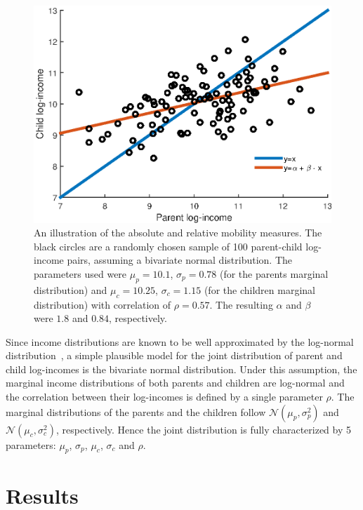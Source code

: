 \documentclass[12pt,times,letter]{article}
\newcommand{\flabel}[1]{\label{fig:#1}}
\numberwithin{equation}{section}
\begin{document}
\begin{figure}[!htb]
\centering
\includegraphics[width=1.0\textwidth]{./figs/bivariate_lines3.eps}
\caption{An illustration of the absolute and relative mobility measures. The black circles are a randomly chosen sample of 100 parent-child log-income pairs, assuming a bivariate normal distribution. The parameters used were $\mu_p=10.1$, $\sigma_p=0.78$ (for the parents marginal distribution) and $\mu_c=10.25$, $\sigma_c=1.15$ (for the children marginal distribution) with correlation of $\rho=0.57$. The resulting $\alpha$ and $\beta$ were $1.8$ and $0.84$, respectively.}
\flabel{lines}
\end{figure}

Since income distributions are known to be well approximated by the log-normal distribution~\citep{pinkovskiy2009parametric}, a simple plausible model for the joint distribution of parent and child log-incomes is the bivariate normal distribution. Under this assumption, the marginal income distributions of both parents and children are log-normal and the correlation between their log-incomes is defined by a single parameter $\rho$. The marginal distributions of the parents and the children follow $\mathcal{N}\left(\mu_p,\sigma_p^2\right)$ and $\mathcal{N}\left(\mu_c,\sigma_c^2\right)$, respectively. Hence the joint distribution is fully characterized by 5 parameters: $\mu_p$, $\sigma_p$, $\mu_c$, $\sigma_c$ and $\rho$.

\section{Results}
\end{document}
